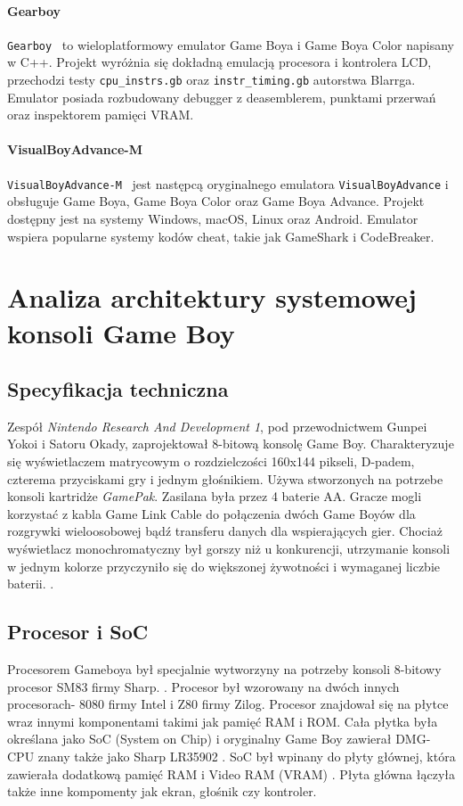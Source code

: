 \documentclass{article}
\begin{document}
\paragraph{Gearboy}
\texttt{Gearboy}~\cite{gearboy} to wieloplatformowy emulator Game Boya
i Game Boya Color napisany w C++. Projekt wyróżnia się dokładną emulacją
procesora i kontrolera LCD, przechodzi testy \texttt{cpu\_instrs.gb} oraz
\texttt{instr\_timing.gb} autorstwa Blarrga. Emulator posiada rozbudowany
debugger z deasemblerem, punktami przerwań oraz inspektorem pamięci VRAM.

\paragraph{VisualBoyAdvance-M}
\texttt{VisualBoyAdvance-M}~\cite{vba} jest następcą oryginalnego emulatora
\texttt{VisualBoyAdvance} i obsługuje Game Boya, Game Boya Color oraz Game
Boya Advance. Projekt dostępny jest na systemy Windows, macOS, Linux oraz
Android. Emulator wspiera popularne systemy kodów cheat, takie jak
GameShark i CodeBreaker.
\newpage
\section{Analiza architektury systemowej konsoli Game Boy}
\subsection{Specyfikacja techniczna}
Zespół \textit{Nintendo Research And Development 1}, pod przewodnictwem Gunpei Yokoi i Satoru Okady, zaprojektował 8-bitową konsolę Game Boy. Charakteryzuje się wyświetlaczem matrycowym o rozdzielczości 160x144 pikseli, D-padem, czterema przyciskami gry i jednym głośnikiem. Używa stworzonych na potrzebe konsoli kartridże \textit{GamePak}. Zasilana była przez 4 baterie AA. Gracze mogli korzystać z kabla Game Link Cable do połączenia dwóch Game Boyów dla rozgrywki wieloosobowej bądź transferu danych dla wspierających gier. Chociaż wyświetlacz monochromatyczny był gorszy niż u konkurencji, utrzymanie konsoli w jednym kolorze przyczyniło się do większonej żywotności i wymaganej liczbie baterii.  \cite{wikipedia-gameboy}. 
\subsection{Procesor i SoC}
Procesorem Gameboya był specjalnie wytworzyny na potrzeby konsoli  8-bitowy procesor SM83 firmy Sharp. \cite{gbctr}. Procesor był wzorowany na dwóch innych procesorach- 8080 firmy Intel i Z80 firmy Zilog. Procesor znajdował się na płytce wraz innymi komponentami takimi jak pamięć RAM i ROM. Cała płytka była określana jako SoC (System on Chip) i oryginalny Game Boy zawierał DMG-CPU znany także jako Sharp LR35902 \cite{copetti}. SoC był wpinany do płyty głównej, która zawierała dodatkową pamięć RAM i Video RAM (VRAM) . Płyta główna łączyła także inne kompomenty jak ekran, głośnik czy kontroler.
\end{document}
